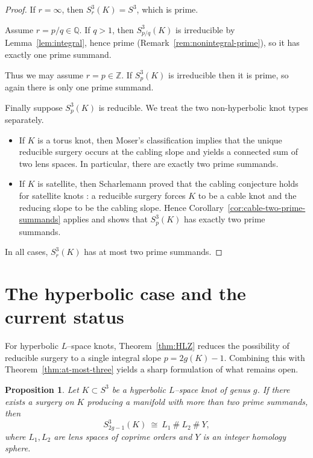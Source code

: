 \documentclass[11pt]{amsart}
\newtheorem{proposition}[theorem]{Proposition}
\numberwithin{equation}{section}
\begin{document}
\begin{proof}
If $r=\infty$, then $S^3_r(K)=S^3$, which is prime.

Assume $r=p/q\in\mathbb{Q}$.  If $q>1$, then $S^3_{p/q}(K)$ is irreducible by Lemma~\ref{lem:integral}, hence prime
(Remark~\ref{rem:nonintegral-prime}), so it has exactly one prime summand.

Thus we may assume $r=p\in\mathbb{Z}$.  If $S^3_p(K)$ is irreducible then it is prime, so again there is only one
prime summand.

Finally suppose $S^3_p(K)$ is reducible.  We treat the two non-hyperbolic knot types separately.
\begin{itemize}
  \item If $K$ is a torus knot, then Moser's classification \cite{Moser71} implies that the unique reducible surgery
  occurs at the cabling slope and yields a connected sum of two lens spaces. In particular, there are exactly two
  prime summands.
  \item If $K$ is satellite, then Scharlemann proved that the cabling conjecture holds for satellite knots
  \cite[Corollary~4.5]{Schar90}: a reducible surgery forces $K$ to be a cable knot and the reducing slope to be the
  cabling slope.  Hence Corollary~\ref{cor:cable-two-prime-summands} applies and shows that $S^3_p(K)$ has exactly two
  prime summands.
\end{itemize}
In all cases, $S^3_r(K)$ has at most two prime summands.
\end{proof}

\section{The hyperbolic case and the current status}

For hyperbolic $L$--space knots, Theorem~\ref{thm:HLZ} reduces the possibility of reducible surgery to a single
integral slope $p=2g(K)-1$.  Combining this with Theorem~\ref{thm:at-most-three} yields a sharp formulation of what
remains open.

\begin{proposition}\label{prop:reduction-to-open-case}
Let $K\subset S^3$ be a hyperbolic $L$--space knot of genus $g$.  If there exists a surgery on $K$ producing a
manifold with more than two prime summands, then
\[
  S^3_{2g-1}(K)\ \cong\ L_1\ \#\ L_2\ \#\ Y,
\]
where $L_1,L_2$ are lens spaces of coprime orders and $Y$ is an integer homology sphere.
\end{proposition}
\end{document}
